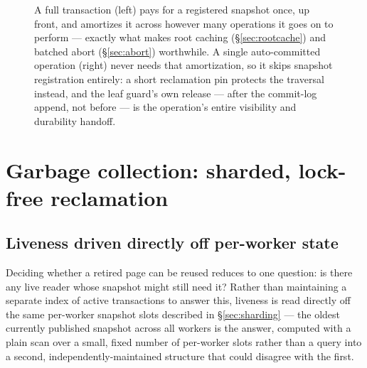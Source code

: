\documentclass[11pt]{article}
\begin{document}
\begin{figure}[h]
\caption{A full transaction (left) pays for a registered snapshot once, up front,
  and amortizes it across however many operations it goes on to perform --- exactly
  what makes root caching (\S\ref{sec:rootcache}) and batched abort
  (\S\ref{sec:abort}) worthwhile. A single auto-committed operation (right) never
  needs that amortization, so it skips snapshot registration entirely: a short
  reclamation pin protects the traversal instead, and the leaf guard's own release
  --- after the commit-log append, not before --- is the operation's entire
  visibility and durability handoff.}
\label{fig:autocommit}
\end{figure}

\section{Garbage collection: sharded, lock-free reclamation}
\label{sec:gc}

\subsection{Liveness driven directly off per-worker state}

Deciding whether a retired page can be reused reduces to one question: is there any
live reader whose snapshot might still need it? Rather than maintaining a separate
index of active transactions to answer this, liveness is read directly off the same
per-worker snapshot slots described in \S\ref{sec:sharding} --- the oldest currently
published snapshot across all workers is the answer, computed with a plain scan over
a small, fixed number of per-worker slots rather than a query into a second,
independently-maintained structure that could disagree with the first.
\end{document}
